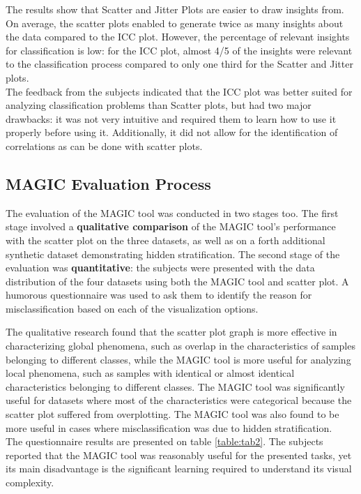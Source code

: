 \documentclass[11pt]{article}
\begin{document}
The results show that Scatter and Jitter Plots are easier to draw insights from. On average, the scatter plots enabled to generate twice as many insights about the data compared to the ICC plot. However, the percentage of relevant insights for classification is low: for the ICC plot, almost 4/5 of the insights were relevant to the classification process compared to only one third for the Scatter and Jitter plots.\\
The feedback from the subjects indicated that the ICC plot was better suited for analyzing classification problems than Scatter plots, but had two major drawbacks: it was not very intuitive and required them to learn how to use it properly before using it. Additionally, it did not allow for the identification of correlations as can be done with scatter plots.

\subsection{MAGIC Evaluation Process}\label{MAGIC Evaluation Process}
The evaluation of the MAGIC tool was conducted in two stages too. The first stage involved a \textbf{qualitative comparison} of the MAGIC tool's performance with the scatter plot on the three datasets, as well as on a forth additional synthetic dataset demonstrating hidden stratification. The second stage of the evaluation was \textbf{quantitative}: the subjects were presented with the data distribution of the four datasets using both the MAGIC tool and scatter plot. A humorous questionnaire was used to ask them to identify the reason for misclassification based on each of the visualization options.

The qualitative research found that the scatter plot graph is more effective in characterizing global phenomena, such as overlap in the characteristics of samples belonging to different classes, while the MAGIC tool is more useful for analyzing local phenomena, such as samples with identical or almost identical characteristics belonging to different classes. The MAGIC tool was significantly useful for datasets where most of the characteristics were categorical because the scatter plot suffered from overplotting. The MAGIC tool was also found to be more useful in cases where misclassification was due to hidden stratification.
\\The questionnaire results are presented on table \ref{table:tab2}. The subjects reported that the MAGIC tool was reasonably useful for the presented tasks, yet its main disadvantage is the significant learning required to understand its visual complexity.
\end{document}
